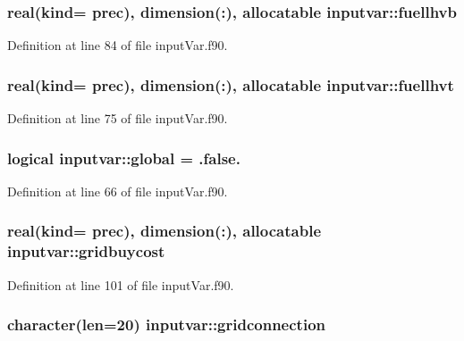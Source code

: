 \hypertarget{classinputvar_a3cd62c9288fded8bd8de8066cbb3ca20}{
\subsubsection[{fuellhvb}]{\setlength{\rightskip}{0pt plus 5cm}real(kind= prec), dimension(\-:), allocatable inputvar\-::fuellhvb}}\label{classinputvar_a3cd62c9288fded8bd8de8066cbb3ca20}


Definition at line 84 of file input\-Var.\-f90.

\hypertarget{classinputvar_afe467edd87c4c589d3ad9d5b14825f94}{
\subsubsection[{fuellhvt}]{\setlength{\rightskip}{0pt plus 5cm}real(kind= prec), dimension(\-:), allocatable inputvar\-::fuellhvt}}\label{classinputvar_afe467edd87c4c589d3ad9d5b14825f94}


Definition at line 75 of file input\-Var.\-f90.

\hypertarget{classinputvar_aa558f36057a5ae647fb16b9659b90d04}{
\subsubsection[{global}]{\setlength{\rightskip}{0pt plus 5cm}logical inputvar\-::global = .false.}}\label{classinputvar_aa558f36057a5ae647fb16b9659b90d04}


Definition at line 66 of file input\-Var.\-f90.

\hypertarget{classinputvar_a10f5c69ad85799dd2ae3a39500ba3005}{
\subsubsection[{gridbuycost}]{\setlength{\rightskip}{0pt plus 5cm}real(kind= prec), dimension(\-:), allocatable inputvar\-::gridbuycost}}\label{classinputvar_a10f5c69ad85799dd2ae3a39500ba3005}


Definition at line 101 of file input\-Var.\-f90.

\hypertarget{classinputvar_a8488f705094b7c59cf8cb06939fe9a7a}{
\subsubsection[{gridconnection}]{\setlength{\rightskip}{0pt plus 5cm}character(len=20) inputvar\-::gridconnection}}\label{classinputvar_a8488f705094b7c59cf8cb06939fe9a7a}


